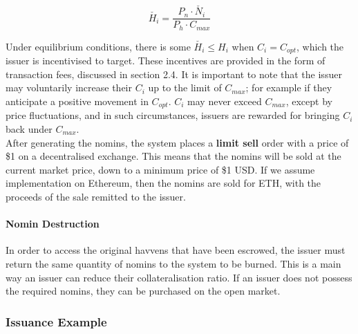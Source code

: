 \begin{equation}
\check{H_i} = \frac{P_n \cdot \check{N_i}}{P_h \cdot C_{max}}  \label{eq:4}
\end{equation}

\noindent Under equilibrium conditions, there is some $\check{H_i} \leq H_i$ when $C_i = C_{opt}$, which the issuer is incentivised to target. These incentives are provided in the form of transaction fees, discussed in section 2.4. It is important to note that the issuer may voluntarily increase their $C_i$ up to the limit of $C_{max}$; for example if they anticipate a positive movement in $C_{opt}$. $C_i$ may never exceed $C_{max}$, except by price fluctuations, and in such circumstances, issuers are rewarded for bringing $C_i$ back under $C_{max}$. \\

\noindent After generating the nomins, the system places a \textbf{limit sell} order with a price of \$1 on a decentralised exchange. This means that the nomins will be sold at the current market price, down to a minimum price of \$1 USD. If we assume implementation on Ethereum, then the nomins are sold for ETH, with the proceeds of the sale remitted to the issuer.

\paragraph{Nomin Destruction}

\noindent In order to access the original havvens that have been escrowed, the issuer must return the same quantity of nomins to the system to be burned. This is a main way 
an issuer can reduce their collateralisation ratio. If an issuer does not possess the required nomins, they can be purchased on the open market.

\subsubsection{Issuance Example}

